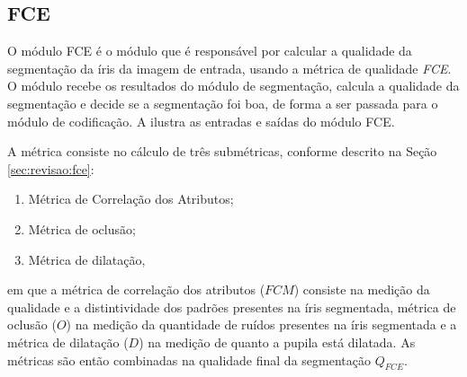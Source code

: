 
\FloatBarrier

\subsection{FCE}\label{sec:metodologia:fce}

\par O módulo \acrshort{FCE} é o módulo que é responsável por calcular a qualidade da segmentação da íris da imagem de entrada, usando a métrica de qualidade \textit{\acrshort{FCE}}. O módulo recebe os resultados do módulo de segmentação, calcula a qualidade da segmentação e decide se a segmentação foi boa, de forma a ser passada para o módulo de codificação. A  ilustra as entradas e saídas do módulo \acrshort{FCE}.


\par A métrica consiste no cálculo de três submétricas, conforme descrito na Seção \ref{sec:revisao:fce}:

\begin{enumerate}
    \item Métrica de Correlação dos Atributos;
    \item Métrica de oclusão;
    \item Métrica de dilatação,
\end{enumerate}

\noindent em que a métrica de correlação dos atributos ($FCM$) consiste na medição da qualidade e a distintividade dos padrões presentes na íris segmentada, métrica de oclusão ($O$) na medição da quantidade de ruídos presentes na íris segmentada e a métrica de dilatação ($D$) na medição de quanto a pupila está dilatada. As métricas são então combinadas na qualidade final da segmentação $Q_{FCE}$.

